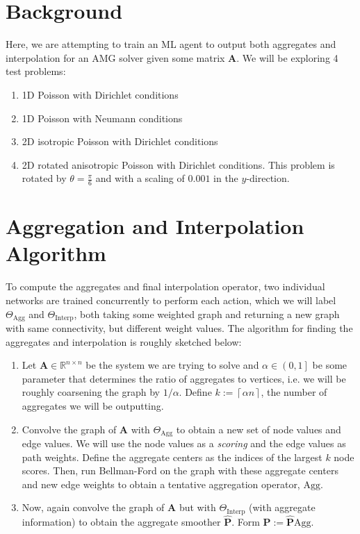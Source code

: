\documentclass{article}
\newcommand{\mat}[1]{\bm{{#1}}}
\newcommand{\ceil}[1]{\left\lceil #1 \right\rceil}
\begin{document}
\section{Background}
Here, we are attempting to train an ML agent to output both aggregates and interpolation for an AMG solver given some matrix $\mat{A}$.  We will be exploring 4 test problems:
\begin{enumerate}
\item 1D Poisson with Dirichlet conditions
\item 1D Poisson with Neumann conditions
\item 2D isotropic Poisson with Dirichlet conditions
\item 2D rotated anisotropic Poisson with Dirichlet conditions.  This problem is rotated by $\theta=\frac{\pi}{6}$ and with a scaling of $0.001$ in the $y$-direction.
\end{enumerate}

\section{Aggregation and Interpolation Algorithm}
To compute the aggregates and final interpolation operator, two individual networks are trained concurrently to perform each action, which we will label $\Theta_{\text{Agg}}$ and $\Theta_{\text{Interp}}$, both taking some weighted graph and returning a new graph with same connectivity, but different weight values.  The algorithm for finding the aggregates and interpolation is roughly sketched below:
\begin{enumerate}
\item Let $\mat{A} \in \mathbb{R}^{n \times n}$ be the system we are trying to solve and $\alpha \in \left(0, 1\right]$ be some parameter that determines the ratio of aggregates to vertices, i.e. we will be roughly coarsening the graph by $1/\alpha$.  Define $k := \ceil{\alpha n}$, the number of aggregates we will be outputting.
\item Convolve the graph of $\mat{A}$ with $\Theta_{\text{Agg}}$ to obtain a new set of node values and edge values.  We will use the node values as a \textit{scoring} and the edge values as path weights.  Define the aggregate centers as the indices of the largest $k$ node scores.  Then, run Bellman-Ford on the graph with these aggregate centers and new edge weights to obtain a tentative aggregation operator, $\text{Agg}$.
\item Now, again convolve the graph of $\mat{A}$ but with $\Theta_{\text{Interp}}$ (with aggregate information) to obtain the aggregate smoother $\mat{\hat{P}}$.  Form $\mat{P} := \mat{\hat{P}}\text{Agg}$.
\end{enumerate}
\end{document}
